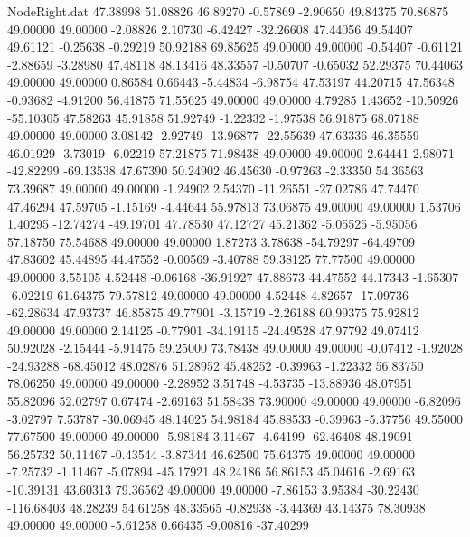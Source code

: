\begin{filecontents}{NodeRight.dat}
  47.38998   51.08826   46.89270    -0.57869   -2.90650   49.84375   70.86875   49.00000   49.00000   -2.08826    2.10730   -6.42427  -32.26608
  47.44056   49.54407   49.61121    -0.25638   -0.29219   50.92188   69.85625   49.00000   49.00000   -0.54407   -0.61121   -2.88659   -3.28980
  47.48118   48.13416   48.33557    -0.50707   -0.65032   52.29375   70.44063   49.00000   49.00000    0.86584    0.66443   -5.44834   -6.98754
  47.53197   44.20715   47.56348    -0.93682   -4.91200   56.41875   71.55625   49.00000   49.00000    4.79285    1.43652  -10.50926  -55.10305
  47.58263   45.91858   51.92749    -1.22332   -1.97538   56.91875   68.07188   49.00000   49.00000    3.08142   -2.92749  -13.96877  -22.55639
  47.63336   46.35559   46.01929    -3.73019   -6.02219   57.21875   71.98438   49.00000   49.00000    2.64441    2.98071  -42.82299  -69.13538
  47.67390   50.24902   46.45630    -0.97263   -2.33350   54.36563   73.39687   49.00000   49.00000   -1.24902    2.54370  -11.26551  -27.02786
  47.74470   47.46294   47.59705    -1.15169   -4.44644   55.97813   73.06875   49.00000   49.00000    1.53706    1.40295  -12.74274  -49.19701
  47.78530   47.12727   45.21362    -5.05525   -5.95056   57.18750   75.54688   49.00000   49.00000    1.87273    3.78638  -54.79297  -64.49709
  47.83602   45.44895   44.47552    -0.00569   -3.40788   59.38125   77.77500   49.00000   49.00000    3.55105    4.52448   -0.06168  -36.91927
  47.88673   44.47552   44.17343    -1.65307   -6.02219   61.64375   79.57812   49.00000   49.00000    4.52448    4.82657  -17.09736  -62.28634
  47.93737   46.85875   49.77901    -3.15719   -2.26188   60.99375   75.92812   49.00000   49.00000    2.14125   -0.77901  -34.19115  -24.49528
  47.97792   49.07412   50.92028    -2.15444   -5.91475   59.25000   73.78438   49.00000   49.00000   -0.07412   -1.92028  -24.93288  -68.45012
  48.02876   51.28952   45.48252    -0.39963   -1.22332   56.83750   78.06250   49.00000   49.00000   -2.28952    3.51748   -4.53735  -13.88936
  48.07951   55.82096   52.02797     0.67474   -2.69163   51.58438   73.90000   49.00000   49.00000   -6.82096   -3.02797    7.53787  -30.06945
  48.14025   54.98184   45.88533    -0.39963   -5.37756   49.55000   77.67500   49.00000   49.00000   -5.98184    3.11467   -4.64199  -62.46408
  48.19091   56.25732   50.11467    -0.43544   -3.87344   46.62500   75.64375   49.00000   49.00000   -7.25732   -1.11467   -5.07894  -45.17921
  48.24186   56.86153   45.04616    -2.69163  -10.39131   43.60313   79.36562   49.00000   49.00000   -7.86153    3.95384  -30.22430 -116.68403
  48.28239   54.61258   48.33565    -0.82938   -3.44369   43.14375   78.30938   49.00000   49.00000   -5.61258    0.66435   -9.00816  -37.40299

\end{filecontents}
